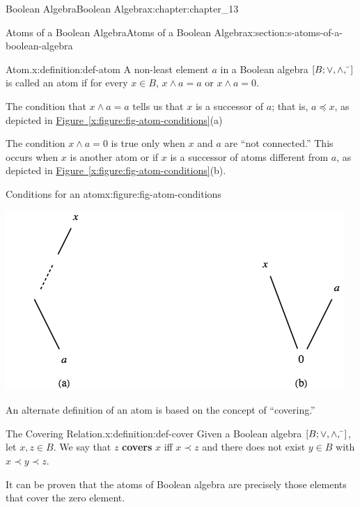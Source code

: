\documentclass[oneside,10pt,]{book}
\newcommand{\xreffont}{\relax}
\newcommand{\terminology}[1]{\textbf{#1}}
\numberwithin{equation}{section}
\begin{document}
\begin{chapterptx}{Boolean Algebra}{}{Boolean Algebra}{}{}{x:chapter:chapter_13}
\begin{sectionptx}{Atoms of a Boolean Algebra}{}{Atoms of a Boolean Algebra}{}{}{x:section:s-atoms-of-a-boolean-algebra}
\begin{definition}{Atom.}{x:definition:def-atom}%
%
A non-least element \(a\) in a Boolean algebra  \([B; \lor , \land, \bar{}\hspace{3 pt}]\) is called an atom if for every \(x \in  B\),  \(x \land  a = a\) or \(x \land  a = 0\).%
\end{definition}
The condition that \(x \land  a = a\) tells us that \(x\) is a successor of \(a\); that is, \(a \preceq  x\), as depicted in \hyperref[x:figure:fig-atom-conditions]{Figure~{\xreffont\ref{x:figure:fig-atom-conditions}}}(a)%
\par
The condition \(x \land  a = 0\) is true only when \(x\) and \(a\) are ``not connected.'' This occurs when \(x\) is another atom or if \(x\) is a successor of atoms different from \(a\), as depicted in  \hyperref[x:figure:fig-atom-conditions]{Figure~{\xreffont\ref{x:figure:fig-atom-conditions}}}(b).%
\begin{figureptx}{Conditions for an atom}{x:figure:fig-atom-conditions}{}%
\begin{image}{0.15}{0.7}{0.15}%
\includegraphics[width=\linewidth]{images/fig-atom-conditions.png}
\end{image}%
\tcblower
\end{figureptx}%
An alternate definition of an atom is based on the concept of ``covering.''%
\begin{definition}{The Covering Relation.}{x:definition:def-cover}%
%
Given a Boolean algebra \([B; \lor , \land, \bar{}\hspace{3 pt}]\), let \(x, z \in B\).  We say that  \(z\) \terminology{covers} \(x\) iff \(x \prec z\) and there does not exist \(y \in B\) with \(x  \prec y  \prec z\).%
\end{definition}
It can be proven that the atoms of Boolean algebra are precisely those elements that cover the zero element.%

\end{sectionptx}
\end{chapterptx}
\end{document}
